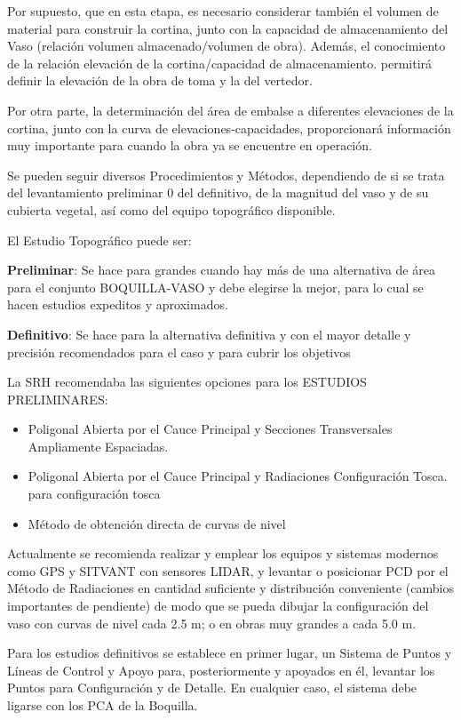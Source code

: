 Por supuesto, que en esta etapa, es necesario considerar también el volumen de material para construir la cortina, junto con la capacidad de almacenamiento del Vaso (relación volumen almacenado/volumen de obra). Además, el conocimiento de la relación elevación de la cortina/capacidad de almacenamiento. permitirá definir la elevación de la obra de toma y la del vertedor.

Por otra parte, la determinación del área de embalse a diferentes elevaciones de la cortina, junto con la curva de elevaciones-capacidades, proporcionará información muy importante para cuando la obra ya se encuentre en operación.

Se pueden seguir diversos Procedimientos y Métodos, dependiendo de si se trata del levantamiento preliminar 0 del definitivo, de la magnitud del vaso y de su cubierta vegetal, así como del equipo topográfico disponible.

El Estudio Topográfico puede ser:

\textbf{Preliminar}: Se hace para grandes cuando hay más de una alternativa de área para el conjunto BOQUILLA-VASO y debe elegirse la mejor, para lo cual se hacen estudios expeditos y aproximados.

\textbf{Definitivo}: Se hace para la alternativa definitiva y con el mayor detalle y precisión recomendados para el caso y para cubrir los objetivos

La SRH recomendaba las siguientes opciones para los ESTUDIOS PRELIMINARES:

\begin{itemize}
    \item Poligonal Abierta por el Cauce Principal y Secciones Transversales Ampliamente Espaciadas.
    \item Poligonal Abierta por el Cauce Principal y Radiaciones Configuración Tosca. para configuración tosca
    \item Método de obtención directa de curvas de nivel
\end{itemize}

Actualmente se recomienda realizar y emplear los equipos y sistemas modernos como GPS y SITVANT con sensores LIDAR, y levantar o posicionar PCD por el Método de Radiaciones en cantidad suficiente y distribución conveniente (cambios importantes de pendiente) de modo que se pueda dibujar la configuración del vaso con curvas de nivel cada 2.5 m; o en obras muy grandes a cada 5.0 m.

Para los estudios definitivos se establece en primer lugar, un Sistema de Puntos y Líneas de Control y Apoyo para, posteriormente y apoyados en él, levantar los Puntos para Configuración y de Detalle. En cualquier caso, el sistema debe ligarse con los PCA de la Boquilla.

